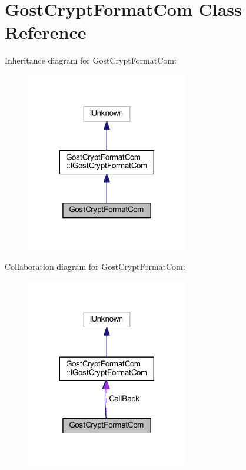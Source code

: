 \hypertarget{class_gost_crypt_format_com}{}\section{Gost\+Crypt\+Format\+Com Class Reference}
\label{class_gost_crypt_format_com}


Inheritance diagram for Gost\+Crypt\+Format\+Com\+:
\nopagebreak
\begin{figure}[H]
\begin{center}
\leavevmode
\includegraphics[width=200pt]{class_gost_crypt_format_com__inherit__graph}
\end{center}
\end{figure}


Collaboration diagram for Gost\+Crypt\+Format\+Com\+:
\nopagebreak
\begin{figure}[H]
\begin{center}
\leavevmode
\includegraphics[width=200pt]{class_gost_crypt_format_com__coll__graph}
\end{center}
\end{figure}
